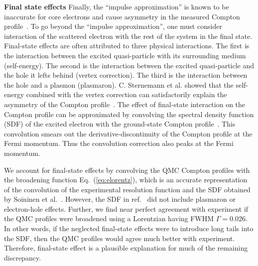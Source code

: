 \documentclass[aps,prb,showpacs,preprintnumbers,amsmath,amssymb,superscriptaddress,twocolumn]{revtex4-1}
\begin{document}
{\bf Final state effects} Finally, the ``impulse approximation'' is known to be inaccurate for core electrons and cause asymmetry in the measured Compton profile~\cite{Eisenberger1970,Sternemann2000,Huotari2001}. To go beyond the ``impulse approximation'', one must consider interaction of the scattered electron with the rest of the system in the final state. Final-state effects are often attributed to three physical interactions. The first is the interaction between the excited quasi-particle with its surrounding medium (self-energy). The second is the interaction between the excited quasi-particle and the hole it lefts behind (vertex correction). The third is the interaction between the hole and a plasmon (plasmaron). C. Sternemann et al. showed that the self-energy combined with the vertex correction can satisfactorily explain the asymmetry of the Compton profile~\cite{Sternemann2000}. The effect of final-state interaction on the Compton profile can be approximated by convolving the spectral density function (SDF) of the excited electron with the ground-state Compton profile~\cite{Soininen2001}. This convolution smears out the derivative-discontinuity of the Compton profile at the Fermi momentum. Thus the convolution correction also peaks at the Fermi momentum.

We account for final-state effects by convolving the QMC Compton profiles with the broadening function Eq.~(\ref{eq:elorentz}), which is an accurate representation of the convolution of the experimental resolution function and the SDF obtained by Soininen et al.~\cite{Soininen2001}. However, the SDF in ref.~\cite{Soininen2001} did not include plasmaron or electron-hole effects. Further, we find near perfect agreement with experiment if the QMC profiles were broadened using a Lorentzian having FWHM $\Gamma=0.026$. In other words, if the neglected final-state effects were to introduce long tails into the SDF, then the QMC profiles would agree much better with experiment. Therefore, final-state effect is a plausible explanation for much of the remaining discrepancy.


\end{document}
